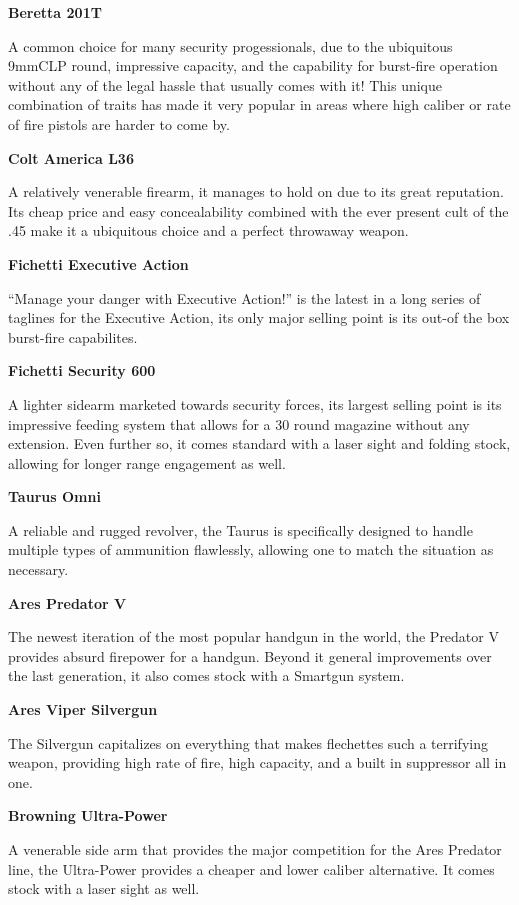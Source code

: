 \begin{mdframed}[linewidth=0pt]
\begin{multicols}{2}
		\textbf{Beretta 201T}
		
		A common choice for many security progessionals, due to the ubiquitous 9mmCLP round, impressive capacity, and the capability for burst-fire operation without any of the legal hassle that usually comes with it! This unique combination of traits has made it very popular in areas where high caliber or rate of fire pistols are harder to come by.
		
		\textbf{Colt America L36}
		
		A relatively venerable firearm, it manages to hold on due to its great reputation. Its cheap price and easy concealability combined with the ever present cult of the .45 make it a ubiquitous choice and a perfect throwaway weapon.
		
		\textbf{Fichetti Executive Action}
		
		“Manage your danger with Executive Action!” is the latest in a long series of taglines for the Executive Action, its only major selling point is its out-of the box burst-fire capabilites.
		
		\textbf{Fichetti Security 600}
		
		A lighter sidearm marketed towards security forces, its largest selling point is its impressive feeding system that allows for a 30 round magazine without any extension. Even further so, it comes standard with a laser sight and folding stock, allowing for longer range engagement as well.
		
		\textbf{Taurus Omni}
		
		A reliable and rugged revolver, the Taurus is specifically designed to handle multiple types of ammunition flawlessly, allowing one to match the situation as necessary.
		
		\textbf{Ares Predator V}
		
		The newest iteration of the most popular handgun in the world, the Predator V provides absurd firepower for a handgun. Beyond it general improvements over the last generation, it also comes stock with a Smartgun system.
		
		\textbf{Ares Viper Silvergun}
		
		The Silvergun capitalizes on everything that makes flechettes such a terrifying weapon, providing high rate of fire, high capacity, and a built in suppressor all in one.
		
		\textbf{Browning Ultra-Power}
		
		A venerable side arm that provides the major competition for the Ares Predator line, the Ultra-Power provides a cheaper and lower caliber alternative. It comes stock with a laser sight as well.
		

\end{multicols}
\end{mdframed}
